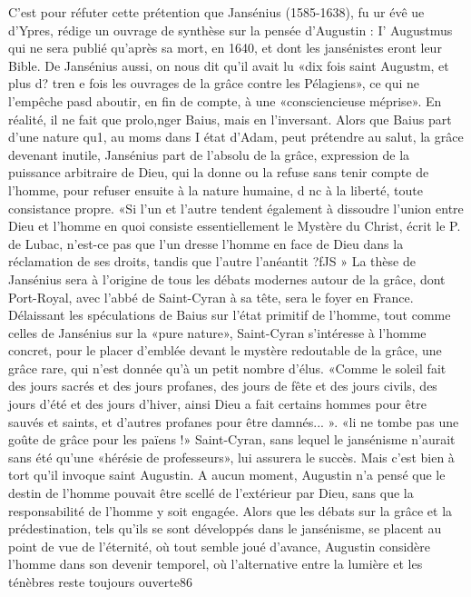  
C'est pour réfuter cette prétention que Jansénius (1585-1638), fu ur évê ue d'Ypres, rédige un ouvrage de synthèse sur la pensée d'Augustin : I' Augustmus qui ne sera publié qu'après sa mort, en 1640, et dont les jansénistes eront leur Bible. De Jansénius aussi, on nous dit qu'il avait lu «dix fois saint Augustm, et plus d? tren e fois les ouvrages de la grâce contre les Pélagiens», ce qui ne l'empêche pasd aboutir, en fin de compte, à une «consciencieuse méprise». En réalité, il ne fait que prolo,nger Baius, mais en l'inversant. Alors que Baius part d'une nature qu1, au moms dans I état d'Adam, peut prétendre au salut, la grâce devenant inutile, Jansénius part de l'absolu de la grâce, expression de la puissance arbitraire de Dieu, qui la donne ou la refuse sans tenir compte de l'homme, pour refuser ensuite à la nature humaine, d nc à la liberté, toute consistance propre. «Si l'un et l'autre tendent également à dissoudre l'union entre Dieu et l'homme en quoi consiste essentiellement le Mystère du Christ, écrit le P. de Lubac, n'est-ce pas que l'un dresse l'homme en face de Dieu dans la réclamation de ses droits, tandis que l'autre l'anéantit ?fJS »
La thèse de Jansénius sera à l'origine de tous les débats modernes autour de la grâce, dont Port-Royal,  avec l'abbé de Saint-Cyran à sa tête, sera le foyer en France. Délaissant les spéculations de Baius sur l'état primitif de l'homme, tout comme celles de Jansénius sur la «pure nature», Saint-Cyran s'intéresse à l'homme concret, pour le placer d'emblée devant le mystère redoutable de la grâce, une grâce rare, qui n'est donnée qu'à un petit nombre d'élus. «Comme le soleil fait des jours sacrés et des jours profanes, des jours de fête et des jours civils, des jours d'été et des jours d'hiver, ainsi Dieu a fait certains hommes pour être sauvés et saints, et d'autres profanes pour être damnés... ». «li ne tombe pas une goûte de grâce pour les païens !» Saint-Cyran, sans lequel le jansénisme n'aurait sans été qu'une «hérésie de professeurs», lui assurera le succès. Mais c'est bien à tort qu'il invoque saint Augustin. A aucun moment, Augustin n'a pensé que le destin de l'homme pouvait être scellé de l'extérieur par Dieu, sans que la responsabilité de l'homme y soit engagée. Alors que les débats sur la grâce et la prédestination, tels qu'ils se sont développés dans le jansénisme, se placent au point de vue de l'éternité, où tout semble joué d'avance, Augustin considère l'homme dans son devenir temporel, où l'alternative entre la lumière et les ténèbres reste toujours ouverte86 

